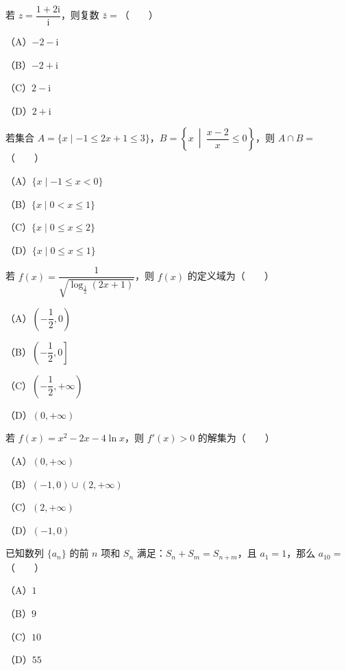 

\begin{question}
若 $z=\dfrac{1+2\mathrm i}{\mathrm i}$，则复数 $\bar z=$\mbox{（　　）}

（A）$-2-\mathrm i$

（B）$-2+\mathrm i$

（C）$2-\mathrm i$

（D）$2+\mathrm i$

\end{question}
\begin{question}
若集合 $A=\{x\mid -1\leqslant2x+1\leqslant3\}$，$B=\left\{x\ \middle|\ \dfrac{x-2}{x}\leqslant0\right\}$，则 $A\cap B=$\mbox{（　　）}

（A）$\{x\mid -1\leqslant x<0\}$

（B）$\{x\mid 0<x\leqslant1\}$

（C）$\{x\mid 0\leqslant x\leqslant2\}$

（D）$\{x\mid 0\leqslant x\leqslant1\}$

\end{question}
\begin{question}
若 $f(x)=\dfrac1{\sqrt{\log_{\frac12}(2x+1)}}$，则 $f(x)$ 的定义域为\mbox{（　　）}

（A）$\left(-\dfrac12,0\right)$

（B）$\left(-\dfrac12,0\right]$

（C）$\left(-\dfrac12,+\infty\right)$

（D）$(0,+\infty)$

\end{question}
\begin{question}
若 $f(x)=x^2-2x-4\ln x$，则 $f'(x)>0$ 的解集为\mbox{（　　）}

（A）$(0,+\infty)$

（B）$(-1,0)\cup(2,+\infty)$

（C）$(2,+\infty)$

（D）$(-1,0)$

\end{question}
\begin{question}
已知数列 $\{a_n\}$ 的前 $n$ 项和 $S_n$ 满足：$S_n+S_m=S_{n+m}$，且 $a_1=1$，那么 $a_{10}=$\mbox{（　　）}

（A）$1$

（B）$9$

（C）$10$

（D）$55$

\end{question}
